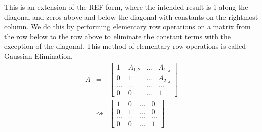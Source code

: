 \documentclass[12pt, a4paper]{article}
\begin{document}
This is an extension of the REF form, where the intended result is 1 along the diagonal and zeros above and below the diagonal with constants on the rightmost column.
We do this by performing elementary row operations on a matrix from the row below to the row above to eliminate the constant terms with the exception of the diagonal. 
This method of elementary row operations is called Gaussian Elimination.
\begin{eqnarray*}
    A & = & \begin{bmatrix}
        1  & A_{1,2} & ... & A_{1,j}\\
        0 & 1 & ... & A_{2,j}\\
        ... & ... & ... & ... \\
        0 & 0 & ... & 1
    \end{bmatrix} \\     
    & \rightsquigarrow & \begin{bmatrix}
        1  & 0 & ... & 0\\
        0 & 1 & ... & 0\\
        ... & ... & ... & ... \\
        0 & 0 & ... & 1
    \end{bmatrix}
\end{eqnarray*}
\end{document}
